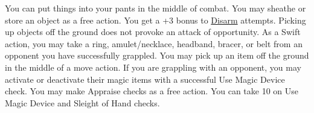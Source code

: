 {You can put things into your pants in the middle of combat.}
{You may sheathe or store an object as a free action.}
{You get a +3 bonus to  \hyperlink{combat:disarm}{Disarm} attempts. Picking up objects off the ground does not provoke an attack of opportunity.}
{As a Swift action, you may take a ring, amulet/necklace, headband, bracer, or belt from an opponent you have successfully grappled. You may pick up an item off the ground in the middle of a move action.}
{If you are grappling with an opponent, you may activate or deactivate their magic items with a successful Use Magic Device check. You may make Appraise checks as a free action.}
{You can take 10 on Use Magic Device and Sleight of Hand checks.}